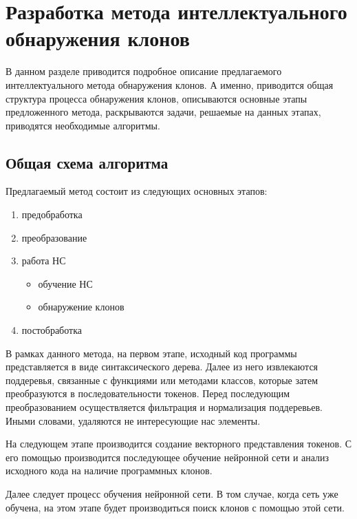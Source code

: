 \chapter{Разработка метода интеллектуального обнаружения клонов}
В данном разделе приводится подробное описание предлагаемого интеллектуального метода обнаружения клонов. А именно, приводится общая структура процесса обнаружения клонов, описываются основные этапы предложенного метода, раскрываются задачи, решаемые на данных этапах, приводятся необходимые алгоритмы. 
\section{Общая схема алгоритма}
Предлагаемый метод состоит из следующих основных этапов:
\begin{enumerate}
\setlength\itemsep{0mm}
\item предобработка
\item преобразование
\item работа НС
\begin{itemize}
\setlength\itemsep{0mm}
\item обучение НС
\item обнаружение клонов
\end{itemize}
\item постобработка
\end{enumerate}

В рамках данного метода, на первом этапе, исходный код программы представляется в виде синтаксического дерева. Далее из него извлекаются поддеревья, связанные с функциями или методами классов, которые затем преобразуются в последовательности токенов. Перед последующим преобразованием осуществляется фильтрация и нормализация поддеревьев. Иными словами, удаляются не интересующие нас элементы.

На следующем этапе производится создание векторного представления токенов. С его помощью производится последующее обучение нейронной сети и анализ исходного кода на наличие программных клонов.

Далее следует процесс обучения нейронной сети. В том случае, когда сеть уже обучена, на этом этапе будет производиться поиск клонов с помощью этой сети.

